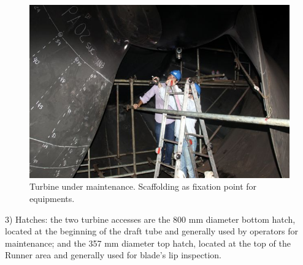 
\begin{figure}[h!]	
	\includegraphics[width=\columnwidth]{figs/viagem/2015_04_28/UG/img_4969}
	\caption{Turbine under maintenance. Scaffolding as fixation point for
	equipments.}
	\label{fig::andaime}
\end{figure}

 
3) Hatches: the two turbine accesses are the 800 mm diameter bottom hatch,
located at the beginning of the draft tube and generally used by operators
for maintenance; and the 357 mm diameter top hatch, located at the top of the
Runner area and generally used for blade's lip inspection.


